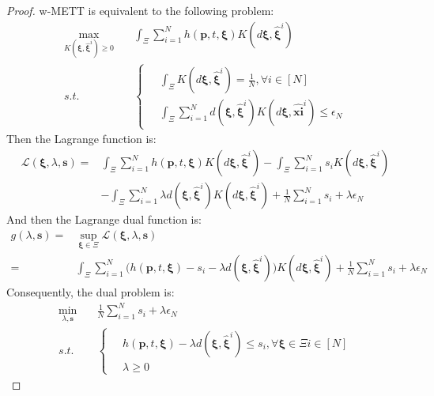 \documentclass{article}
\begin{document}
\begin{proof}
	w-METT is equivalent to the following problem:
	\begin{align}
		\max_{K(\bm{\xi}, \hat{\bm{\xi}}^i) \geq 0 } \quad & \int_{\Xi} \sum_{i=1}^{N} h(\bm{p}, t, \bm{\xi}) K(d\bm{\xi}, \hat{\bm{\xi}}^i) \label{drsp-obj}\\
		s.t. \quad & \left\{
		\begin{aligned}
			\ & \int_{\Xi} K(d\bm{\xi}, \hat{\bm{\xi}}^i) = \frac{1}{N}, \forall i \in [N] \\
			& \int_{\Xi} \sum_{i=1}^{N} d(\bm{\xi}, \hat{\bm{\xi}}^i) K(d\bm{\xi}, \hat{\bm{xi}}^i) \leq \epsilon_N
		\end{aligned} \right. \label{drsp-cons}
	\end{align}
	Then the Lagrange function is:
	\begin{align}
		\mathcal{L} (\bm{\xi}, \lambda, \bm{s}) = & \int_{\Xi} \sum_{i=1}^{N} h(\bm{p}, t, \bm{\xi}) K(d\bm{\xi}, \hat{\bm{\xi}}^i)  - \int_{\Xi} \sum_{i=1}^{N} s_i K(d\bm{\xi}, \hat{\bm{\xi}}^i) \\
		& - \int_{\Xi} \sum_{i=1}^{N} \lambda d(\bm{\xi}, \hat{\bm{\xi}}^i) K(d\bm{\xi}, \hat{\bm{\xi}}^i) + \frac{1}{N} \sum_{i=1}^{N} s_i + \lambda \epsilon_N
	\end{align}
	And then the Lagrange dual function is:
	\begin{align}
		g(\lambda, \bm{s})  = & \sup_{\bm{\xi} \in \Xi} \mathcal{L}(\bm{\xi}, \lambda, \bm{s}) \\
		= & \int_{\Xi} \sum_{i=1}^{N} \Big ( h(\bm{p}, t, \bm{\xi}) - s_i - \lambda d(\bm{\xi}, \hat{\bm{\xi}}^i) \Big ) K(d\bm{\xi}, \hat{\bm{\xi}}^i) + \frac{1}{N} \sum_{i=1}^{N} s_i + \lambda \epsilon_N
	\end{align}
	Consequently, the dual problem is:
	\begin{align}
		\min_{\lambda, \bm{s}} \quad & \frac{1}{N} \sum_{i=1}^{N} s_i + \lambda \epsilon_N \\
		s.t. \quad & \left\{
		\begin{aligned}
			\ & h(\bm{p}, t, \bm{\xi}) - \lambda d(\bm{\xi}, \hat{\bm{\xi}}^i) \leq s_i, \forall \bm{\xi} \in \Xi i \in [N] \\
			& \lambda \geq 0
		\end{aligned}\right. 
	\end{align}
	

\end{proof}
\end{document}
